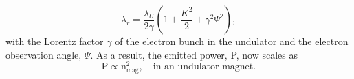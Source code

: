 \begin{equation}
\lambda_{r} = \frac{\lambda_{U}}{2 \gamma}\left(1+\frac{K^{2}}{2}+\gamma^{2}\Psi^{2}\right),\label{eqn:fundamental-wavelength}
\end{equation}
with the Lorentz factor $\gamma$ of the electron bunch in the undulator and the electron observation angle, $\Psi$. As a result, the emitted power, P, now scales as \citep{Kim-1986-NIMPRA}
\begin{equation}
\text{P} \propto \text{n}_{\text{mag}}^{2},\quad \text{in an undulator magnet.}
\end{equation}
%
%
%
